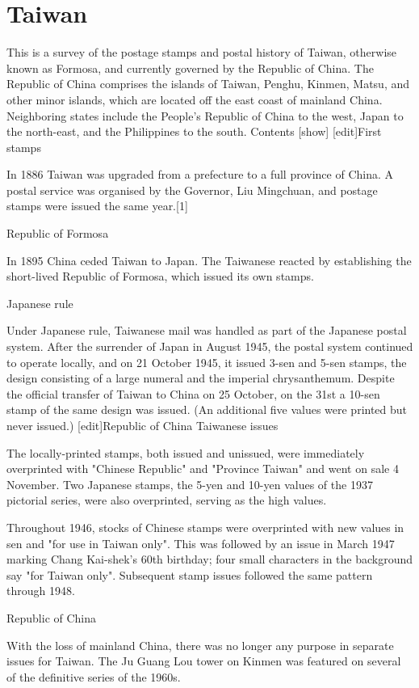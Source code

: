 
\section{Taiwan}

This is a survey of the postage stamps and postal history of Taiwan, otherwise known as Formosa, and currently governed by the Republic of China.
The Republic of China comprises the islands of Taiwan, Penghu, Kinmen, Matsu, and other minor islands, which are located off the east coast of mainland China. Neighboring states include the People's Republic of China to the west, Japan to the north-east, and the Philippines to the south.
Contents  [show] 
[edit]First stamps

In 1886 Taiwan was upgraded from a prefecture to a full province of China. A postal service was organised by the Governor, Liu Mingchuan, and postage stamps were issued the same year.[1]

Republic of Formosa


In 1895 China ceded Taiwan to Japan. The Taiwanese reacted by establishing the short-lived Republic of Formosa, which issued its own stamps.

Japanese rule

Under Japanese rule, Taiwanese mail was handled as part of the Japanese postal system. After the surrender of Japan in August 1945, the postal system continued to operate locally, and on 21 October 1945, it issued 3-sen and 5-sen stamps, the design consisting of a large numeral and the imperial chrysanthemum. Despite the official transfer of Taiwan to China on 25 October, on the 31st a 10-sen stamp of the same design was issued. (An additional five values were printed but never issued.)
[edit]Republic of China Taiwanese issues

The locally-printed stamps, both issued and unissued, were immediately overprinted with "Chinese Republic" and "Province Taiwan" and went on sale 4 November. Two Japanese stamps, the 5-yen and 10-yen values of the 1937 pictorial series, were also overprinted, serving as the high values.

Throughout 1946, stocks of Chinese stamps were overprinted with new values in sen and "for use in Taiwan only". This was followed by an issue in March 1947 marking Chang Kai-shek's 60th birthday; four small characters in the background say "for Taiwan only". Subsequent stamp issues followed the same pattern through 1948.

Republic of China

With the loss of mainland China, there was no longer any purpose in separate issues for Taiwan.
The Ju Guang Lou tower on Kinmen was featured on several of the definitive series of the 1960s.

  